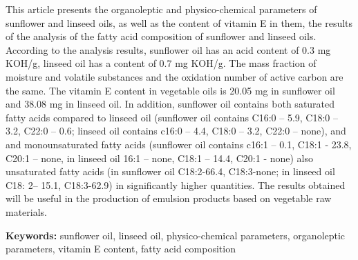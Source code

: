This article presents the organoleptic and physico-chemical parameters
of sunflower and linseed oils, as well as the content of vitamin E in
them, the results of the analysis of the fatty acid composition of
sunflower and linseed oils. According to the analysis results, sunflower
oil has an acid content of 0.3 mg KOH/g, linseed oil has a content of
0.7 mg KOH/g. The mass fraction of moisture and volatile substances and
the oxidation number of active carbon are the same. The vitamin E
content in vegetable oils is 20.05 mg in sunflower oil and 38.08 mg in
linseed oil. In addition, sunflower oil contains both saturated fatty
acids compared to linseed oil (sunflower oil contains C16:0 -- 5.9,
C18:0 -- 3.2, C22:0 -- 0.6; linseed oil contains c16:0 -- 4.4, C18:0 --
3.2, C22:0 -- none), and and monounsaturated fatty acids (sunflower oil
contains c16:1 -- 0.1, C18:1 - 23.8, C20:1 -- none, in linseed oil 16:1
-- none, C18:1 -- 14.4, C20:1 - none) also unsaturated fatty acids (in
sunflower oil C18:2-66.4, C18:3-none; in linseed oil C18: 2-- 15.1,
C18:3-62.9) in significantly higher quantities. The results obtained
will be useful in the production of emulsion products based on vegetable
raw materials.

{\bfseries Keywords:} sunflower oil, linseed oil, physico-chemical
parameters, organoleptic parameters, vitamin E content, fatty acid
composition

